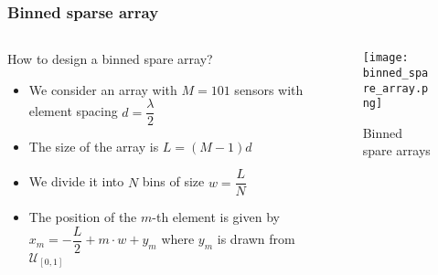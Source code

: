 \documentclass[UKenglish,8pt,aspectratio=1610]{beamer}
\begin{document}
\begin{frame}
	\frametitle{Binned sparse array  \cite{Sampling_theory}}


	\begin{columns}
	
	\begin{column}{0.7\textwidth}
How to design a binned spare array?
\begin{itemize}
	\item We consider an array with $M=101$ sensors with element spacing $d=\dfrac{\lambda}{2}$
	\item The size of the array is $L=(M-1)d$
	\item We divide it into $N$ bins of size $w=\dfrac{L}{N}$
	\item The position of the $m$-th element is given by $x_m = -\dfrac{L}{2} + m\cdot w + y_m$ where $y_m$ is drawn from $\mathcal{U}_{[0,1]}$
\end{itemize}
	\end{column}
	
	\begin{column}{0.3\textwidth}
		\begin{figure}[h!]
			\vspace{-25pt}
			\texttt{[image: binned\_spare\_array.png]}
			\vspace{-8pt}
			\caption{Binned spare arrays}
			\centering
			\vspace{-25pt}
		\end{figure}
\end{column}
\end{columns}


\end{frame}
\end{document}
